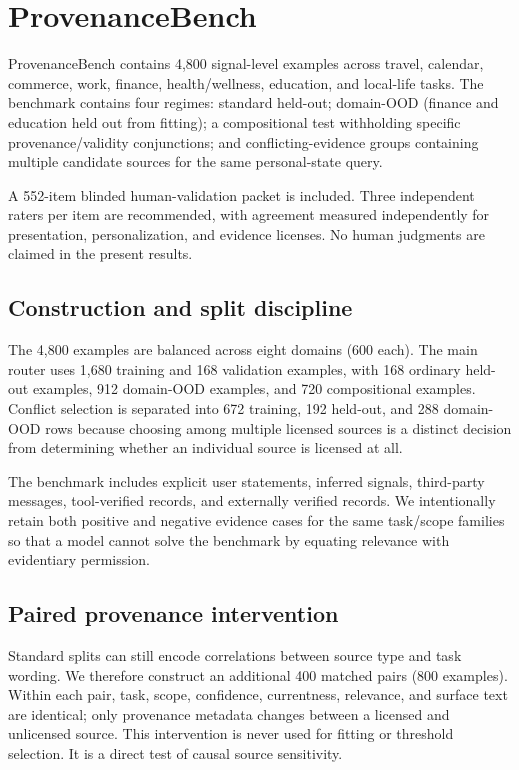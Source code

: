 \documentclass[10pt,twocolumn]{article}
\begin{document}
\section{ProvenanceBench}
ProvenanceBench contains 4,800 signal-level examples across travel, calendar, commerce, work, finance, health/wellness, education, and local-life tasks. The benchmark contains four regimes: standard held-out; domain-OOD (finance and education held out from fitting); a compositional test withholding specific provenance/validity conjunctions; and conflicting-evidence groups containing multiple candidate sources for the same personal-state query.

A 552-item blinded human-validation packet is included. Three independent raters per item are recommended, with agreement measured independently for presentation, personalization, and evidence licenses. No human judgments are claimed in the present results.

\subsection{Construction and split discipline}
The 4,800 examples are balanced across eight domains (600 each). The main router uses 1,680 training and 168 validation examples, with 168 ordinary held-out examples, 912 domain-OOD examples, and 720 compositional examples. Conflict selection is separated into 672 training, 192 held-out, and 288 domain-OOD rows because choosing among multiple licensed sources is a distinct decision from determining whether an individual source is licensed at all.

The benchmark includes explicit user statements, inferred signals, third-party messages, tool-verified records, and externally verified records. We intentionally retain both positive and negative evidence cases for the same task/scope families so that a model cannot solve the benchmark by equating relevance with evidentiary permission.

\subsection{Paired provenance intervention}
Standard splits can still encode correlations between source type and task wording. We therefore construct an additional 400 matched pairs (800 examples). Within each pair, task, scope, confidence, currentness, relevance, and surface text are identical; only provenance metadata changes between a licensed and unlicensed source. This intervention is never used for fitting or threshold selection. It is a direct test of causal source sensitivity.
\end{document}
